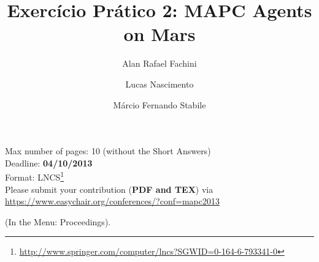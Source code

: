\documentclass{llncs}
\begin{document}
\title{Exercício Prático 2: MAPC Agents on Mars}

\author{Alan Rafael Fachini \and Lucas Nascimento \and Márcio Fernando Stabile}

\maketitle

\begin{center}
Max number of pages: 10 (without the Short Answers) \\
Deadline: \textbf{04/10/2013}\\
Format: LNCS\footnote{\url{http://www.springer.com/computer/lncs?SGWID=0-164-6-793341-0}}\\
Please submit your contribution (\textbf{PDF and TEX}) via\\ \url{https://www.easychair.org/conferences/?conf=mapc2013}

(In the Menu: Proceedings).
\end{center}
\end{document}
